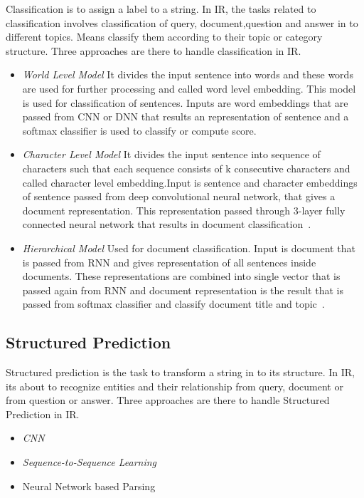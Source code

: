 \documentclass{doublecol-new}
\theoremstyle{TH}{
\newtheorem{lemma}{Lemma}
\newtheorem{theorem}[lemma]{Theorem}
\newtheorem{corrolary}[lemma]{Corrolary}
\newtheorem{conjecture}[lemma]{Conjecture}
\newtheorem{proposition}[lemma]{Proposition}
\newtheorem{claim}[lemma]{Claim}
\newtheorem{stheorem}[lemma]{Wrong Theorem}
\newtheorem{algorithm}{Algorithm}
}
\theoremstyle{THrm}{
\newtheorem{definition}{Definition}[section]
\newtheorem{question}{Question}[section]
\newtheorem{remark}{Remark}
\newtheorem{scheme}{Scheme}
}
\theoremstyle{THhit}{
\newtheorem{case}{Case}[section]
}
\begin{document}
Classification is to assign a label to a string. In IR, the tasks related to classification involves classification of query, document,question and answer in to different topics. Means classify them according to their topic or category structure. Three approaches are there to handle classification in IR. 
\begin{itemize}
	\item {\em World Level Model} It divides the input sentence into words and these words are used for further processing and called word level embedding. This model is used for classification of sentences. Inputs are word embeddings that are passed from CNN or DNN that results an representation of sentence and a softmax classifier is used to classify or compute score. 
	\item {\em Character Level Model} It divides the input sentence into sequence of characters such that each sequence consists of k consecutive characters and called character level embedding.Input is sentence and character embeddings of sentence passed from deep convolutional neural network, that gives a document representation. This representation passed through 3-layer fully connected neural network that results in document classification~\cite{zhang2015character}. 
	\item {\em Hierarchical Model} Used for document classification. Input is document that is passed from RNN and gives representation of all sentences inside documents. These representations are combined into single vector that is passed again from RNN and document representation is the result that is passed from softmax classifier and classify document title and topic~\cite{yang2016hierarchical}.  
\end{itemize} 
\subsection{Structured Prediction}
Structured prediction is the task to transform a string in to its structure. In IR, its about to recognize entities and their relationship from query, document or from question or answer.
Three approaches are there to handle Structured Prediction in IR. 
\begin{itemize}
	\item {\em CNN} 
	\item {\em Sequence-to-Sequence Learning}
	\item {Neural Network based Parsing}
\end{itemize}  
\end{document}
